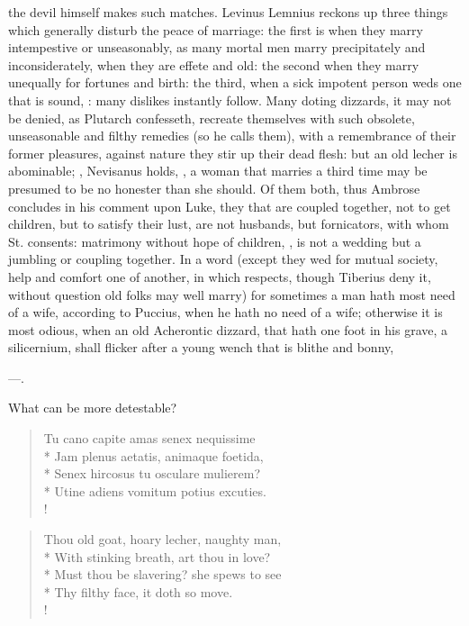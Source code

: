 the devil himself makes such matches. Levinus Lemnius reckons up
three things which generally disturb the peace of marriage: the first
is when they marry intempestive or unseasonably, as many mortal men
marry precipitately and inconsiderately, when they are effete and old:
the second when they marry unequally for fortunes and birth: the third,
when a sick impotent person weds one that is sound, : many dislikes instantly follow. Many doting dizzards, it
may not be denied, as Plutarch confesseth, recreate themselves
with such obsolete, unseasonable and filthy remedies (so he calls
them), with a remembrance of their former pleasures, against nature
they stir up their dead flesh: but an old lecher is abominable; , Nevisanus holds, , a woman that marries a third time may be presumed to be no
honester than she should. Of them both, thus Ambrose concludes in his
comment upon Luke, they that are coupled together, not to get
children, but to satisfy their lust, are not husbands, but fornicators,
with whom St. \Austin{} consents: matrimony without hope of children, , is not a wedding but a jumbling
or coupling together. In a word (except they wed for mutual society,
help and comfort one of another, in which respects, though
Tiberius deny it, without question old folks may well marry) for
sometimes a man hath most need of a wife, according to Puccius, when he
hath no need of a wife; otherwise it is most odious, when an old
Acherontic dizzard, that hath one foot in his grave, a silicernium,
shall flicker after a young wench that is blithe and bonny,

---.

What can be more detestable?
%
\begin{latin}%
\begin{verse}%
Tu cano capite amas senex nequissime\\*
Jam plenus aetatis, animaque foetida,\\*
Senex hircosus tu osculare mulierem?\\*
Utine adiens vomitum potius excuties.\\!
\end{verse}%
\end{latin}%
\translationrule%
\begin{verse}%
Thou old goat, hoary lecher, naughty man,\\*
With stinking breath, art thou in love?\\*
Must thou be slavering? she spews to see\\*
Thy filthy face, it doth so move.\\!
\end{verse}%
%

